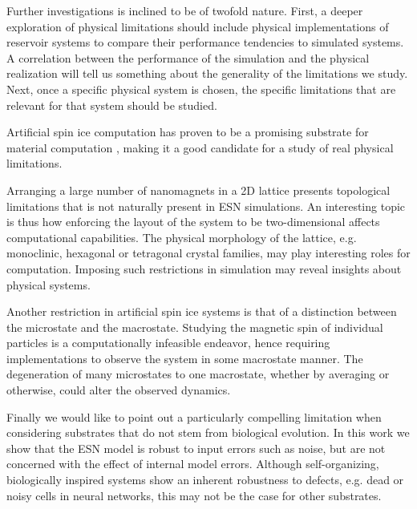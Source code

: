 Further investigations is inclined to be of twofold nature. First, a deeper
exploration of physical limitations should include physical implementations of
reservoir systems to compare their performance tendencies to simulated
systems. A correlation between the performance of the simulation and the
physical realization will tell us something about the generality of the
limitations we study. Next, once a specific physical system is chosen, the
specific limitations that are relevant for that system should be studied.

Artificial spin ice computation has proven to be a promising substrate for
material computation \cite{jensen_computation_2018}, making it a good candidate
for a study of real physical limitations.

Arranging a large number of nanomagnets in a 2D lattice presents topological
limitations that is not naturally present in ESN simulations. An interesting
topic is thus how enforcing the layout of the system to be two-dimensional
affects computational capabilities. The physical morphology of the lattice,
e.g. monoclinic, hexagonal or tetragonal crystal families, may play interesting
roles for computation. Imposing such restrictions in simulation may reveal
insights about physical systems.

Another restriction in artificial spin ice systems is that of a distinction
between the microstate and the macrostate. Studying the magnetic spin of
individual particles is a computationally infeasible endeavor, hence requiring
implementations to observe the system in some macrostate manner. The
degeneration of many microstates to one macrostate, whether by averaging or
otherwise, could alter the observed dynamics.

Finally we would like to point out a particularly compelling limitation when
considering substrates that do not stem from biological evolution. In this work
we show that the ESN model is robust to input errors such as noise, but are not
concerned with the effect of internal model errors. Although self-organizing,
biologically inspired systems show an inherent robustness to defects, e.g. dead
or noisy cells in neural networks, this may not be the case for other
substrates.

